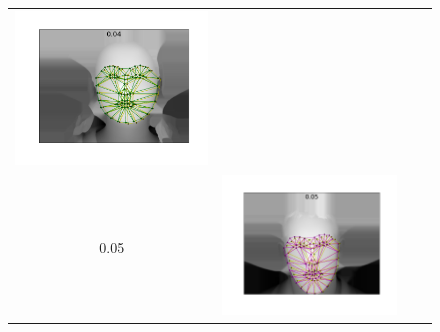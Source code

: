 \begin{figure}
{\begin{tabular}{cccc}
    \includegraphics[valign=m,scale=0.16]{statistical_normals/images/lk2d/aam_error_examples/spherical_004_330}  \\
    0.05                                                                                                         &
    \includegraphics[valign=m,scale=0.16]{statistical_normals/images/lk2d/aam_error_examples/depth_005_138}      &

\end{tabular}}
\end{figure}
